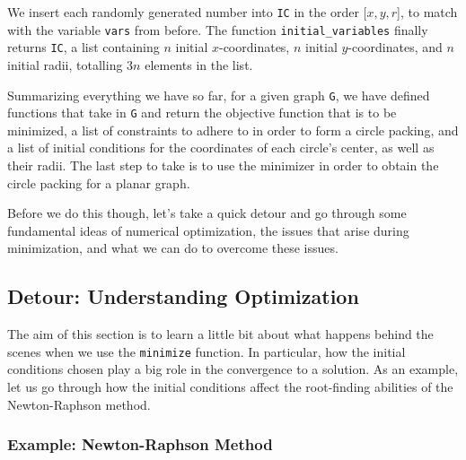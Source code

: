 \begin{flushleft}
We insert each randomly generated number into \texttt{IC} in the order [$x,y,r$], to match with the variable \texttt{vars} from before. The function \texttt{initial\_variables} finally returns \texttt{IC}, a list containing $n$ initial $x$-coordinates, $n$ initial $y$-coordinates, and $n$ initial radii, totalling $3n$ elements in the list.
\end{flushleft}

\begin{flushleft}
Summarizing everything we have so far, for a given graph \texttt{G}, we have defined functions that take in \texttt{G} and return the objective function that is to be minimized, a list of constraints to adhere to in order to form a circle packing, and a list of initial conditions for the coordinates of each circle's center, as well as their radii. The last step to take is to use the minimizer in order to obtain the circle packing for a planar graph.
\end{flushleft}

\begin{flushleft}
Before we do this though, let's take a quick detour and go through some fundamental ideas of numerical optimization, the issues that arise during minimization, and what we can do to overcome these issues. 
\end{flushleft}

\subsection{Detour: Understanding Optimization}

\begin{flushleft}
The aim of this section is to learn a little bit about what happens behind the scenes when we use the \texttt{minimize} function. In particular, how the initial conditions chosen play a big role in the convergence to a solution. As an example, let us go through how the initial conditions affect the root-finding abilities of the Newton-Raphson method.
\end{flushleft}

\subsubsection{Example: Newton-Raphson Method}

